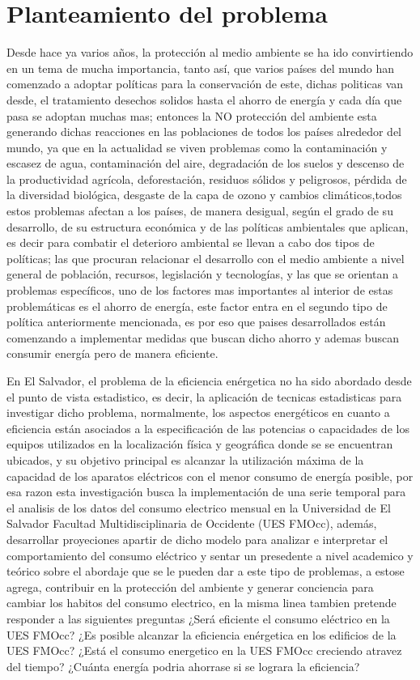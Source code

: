 \documentclass[12pt,letterpaper]{report}
\begin{document}
\section{Planteamiento del problema}
Desde hace ya varios años, la protección al medio ambiente se ha ido convirtiendo en un tema de mucha importancia,
tanto así, que varios países del mundo han comenzado a adoptar políticas para la conservación de este, dichas politicas van desde, el tratamiento desechos solidos hasta el ahorro de energía y cada día que pasa se adoptan muchas mas; entonces la NO protección del ambiente esta generando dichas reacciones en las poblaciones de todos los países alrededor del mundo, ya que en la actualidad se viven problemas como la contaminación y escasez de agua, contaminación del aire, degradación de los suelos y descenso de la productividad agrícola, deforestación, residuos sólidos y peligrosos, pérdida de la diversidad biológica, desgaste de la capa de ozono y cambios climáticos,todos estos problemas afectan a los países, de manera desigual, según el grado de su desarrollo, de su estructura económica y de las políticas ambientales que aplican, es decir para combatir el deterioro ambiental se llevan a cabo dos tipos de políticas; las que procuran relacionar el desarrollo con el medio ambiente a nivel general de población, recursos, legislación y tecnologías, y las que se orientan a problemas específicos, uno de los factores mas importantes al interior de estas problemáticas es el ahorro de energía, este factor entra en el segundo tipo de política anteriormente mencionada, es por eso que paises desarrollados están comenzando a implementar medidas que buscan dicho ahorro y ademas buscan consumir energía pero de manera eficiente.

En El Salvador, el problema de la eficiencia enérgetica no ha sido abordado desde el punto de vista estadistico, es decir, la aplicación de tecnicas estadisticas para investigar dicho problema,
normalmente, los aspectos energéticos en cuanto a eficiencia están asociados a la especificación de
las potencias o capacidades de los equipos utilizados en la localización física y geográfica
donde se se encuentran ubicados, y su objetivo principal es alcanzar la utilización máxima de la
capacidad de los aparatos eléctricos con el menor consumo de energía posible, por esa razon esta investigación busca la implementación de una serie temporal para el analisis de los datos del consumo electrico mensual en la Universidad de El Salvador Facultad Multidisciplinaria de Occidente (UES FMOcc), además, desarrollar proyeciones apartir de dicho modelo para analizar e interpretar el comportamiento del consumo eléctrico y sentar un presedente a nivel academico y teórico sobre el abordaje que se le pueden dar a este tipo de problemas, a estose agrega, contribuir en la protección del ambiente y generar conciencia para cambiar los habitos del consumo electrico, en la misma linea tambien pretende responder a las siguientes preguntas ¿Será eficiente el consumo eléctrico en la UES FMOcc? ¿Es posible alcanzar la eficiencia enérgetica en los edificios de la UES FMOcc? ¿Está el consumo energetico en la UES FMOcc creciendo atravez del tiempo? ¿Cuánta energía podria ahorrase si se lograra la eficiencia?
\end{document}
